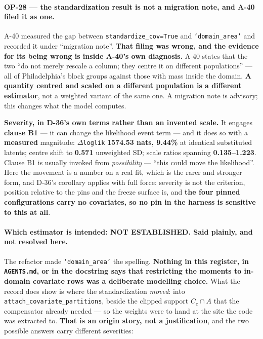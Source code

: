 \documentclass[
  10pt,
]{article}
\begin{document}
\paragraph{OP-28 --- the standardization result is not a migration note, and A-40 filed it as one.}
A-40 measured the gap between \texttt{standardize\_cov=True} and \texttt{'domain\_area'} and recorded it under ``migration note''. \textbf{That filing was wrong, and the evidence for its being wrong is inside A-40's own diagnosis.} A-40 states that the two ``do not merely rescale a column; they centre it on different populations'' --- all of Philadelphia's block groups against those with mass inside the domain. \textbf{A quantity centred and scaled on a different population is a different estimator}, not a weighted variant of the same one. A migration note is advisory; this changes what the model computes.

\textbf{Severity, in D-36's own terms rather than an invented scale.} It engages \textbf{clause B1} --- it can change the likelihood event term --- and it does so with a \textbf{measured} magnitude: \(\Delta\)\texttt{loglik} \textbf{1574.53 nats, 9.44\%} at identical substituted latents; centre shift to \textbf{0.571} unweighted SD; scale ratios spanning \textbf{0.135--1.223}. Clause B1 is usually invoked from \emph{possibility} --- ``this could move the likelihood''. Here the movement is a number on a real fit, which is the rarer and stronger form, and D-36's corollary applies with full force: severity is not the criterion, position relative to the pins and the freeze surface is, and \textbf{the four pinned configurations carry no covariates, so no pin in the harness is sensitive to this at all}.

\paragraph{Which estimator is intended: NOT ESTABLISHED. Said plainly, and not resolved here.}
The refactor made \texttt{'domain\_area'} the spelling. \textbf{Nothing in this register, in \texttt{AGENTS.md}, or in the docstring says that restricting the moments to in-domain covariate rows was a deliberate modelling choice.} What the record does show is where the standardization \emph{moved}: into \texttt{attach\_covariate\_partitions}, beside the clipped support \(C_c \cap A\) that the compensator already needed --- so the weights were to hand at the site the code was extracted to. \textbf{That is an origin story, not a justification}, and the two possible answers carry different severities:
\end{document}
